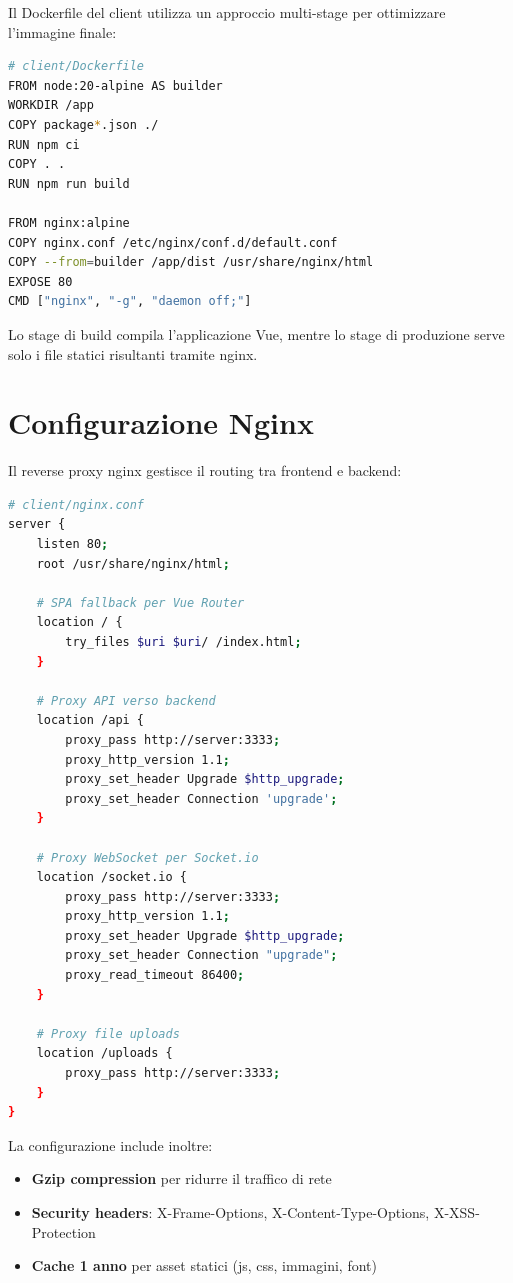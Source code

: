 \documentclass{report}
\begin{document}
Il Dockerfile del client utilizza un approccio multi-stage per ottimizzare l'immagine finale:

\begin{lstlisting}[language=bash, caption={Dockerfile multi-stage del client}]
# client/Dockerfile
FROM node:20-alpine AS builder
WORKDIR /app
COPY package*.json ./
RUN npm ci
COPY . .
RUN npm run build

FROM nginx:alpine
COPY nginx.conf /etc/nginx/conf.d/default.conf
COPY --from=builder /app/dist /usr/share/nginx/html
EXPOSE 80
CMD ["nginx", "-g", "daemon off;"]
\end{lstlisting}

Lo stage di build compila l'applicazione Vue, mentre lo stage di produzione serve solo i file statici risultanti tramite nginx.

\section{Configurazione Nginx}

Il reverse proxy nginx gestisce il routing tra frontend e backend:

\begin{lstlisting}[language=bash, caption={Configurazione nginx}]
# client/nginx.conf
server {
    listen 80;
    root /usr/share/nginx/html;

    # SPA fallback per Vue Router
    location / {
        try_files $uri $uri/ /index.html;
    }

    # Proxy API verso backend
    location /api {
        proxy_pass http://server:3333;
        proxy_http_version 1.1;
        proxy_set_header Upgrade $http_upgrade;
        proxy_set_header Connection 'upgrade';
    }

    # Proxy WebSocket per Socket.io
    location /socket.io {
        proxy_pass http://server:3333;
        proxy_http_version 1.1;
        proxy_set_header Upgrade $http_upgrade;
        proxy_set_header Connection "upgrade";
        proxy_read_timeout 86400;
    }

    # Proxy file uploads
    location /uploads {
        proxy_pass http://server:3333;
    }
}
\end{lstlisting}

La configurazione include inoltre:
\begin{itemize}
    \item \textbf{Gzip compression} per ridurre il traffico di rete
    \item \textbf{Security headers}: X-Frame-Options, X-Content-Type-Options, X-XSS-Protection
    \item \textbf{Cache 1 anno} per asset statici (js, css, immagini, font)
\end{itemize}
\end{document}
